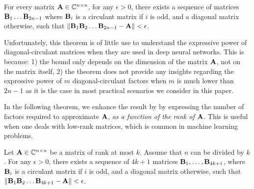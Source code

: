 \begin{theorem} \label{theorem:huhtanen}
  For every matrix $\mathbf{A} \in {\ensuremath \mathbb{C}}^{n \times n}$, for any $\epsilon > 0$, there exists a sequence of matrices $\mathbf{B}_1 \ldots \mathbf{B}_{2n-1}$ where $\mathbf{B}_{i}$ is a circulant matrix if $i$ is odd, and a diagonal matrix otherwise, such that $\norm{\mathbf{B}_{1} \mathbf{B}_{2} \ldots \mathbf{B}_{2n-1} - \mathbf{A}} < \epsilon$.
\end{theorem}

Unfortunately, this theorem is of little use to understand the expressive power of diagonal-circulant matrices when they are used in deep neural networks.
This is because: 1) the bound only depends on the dimension of the matrix $\mathbf{A}$, not on the matrix itself, 2) the theorem does not provide any insights regarding the expressive power of $m$ diagonal-circulant factors when $m$ is much lower than $2n - 1$ as it is the case in most practical scenarios we consider in this paper. 

In the following theorem, we enhance the result by \citet{Huhtanen2015} by expressing the number of factors required to approximate $\mathbf{A}$, \emph{as a function of the rank of $\mathbf{A}$}.
This is useful when one deals with low-rank matrices, which is common in machine learning problems. 

\begin{theorem} \label{theorem:rank-decomposition}
Let $\mathbf{A} \in {\ensuremath \mathbb{C}}^{n \times n}$ be a matrix of rank at most $k$.
Assume that $n$ can be divided by $k$.
For any $\epsilon > 0$, there exists a sequence of $4k+1$ matrices $\mathbf{B}_{1}, \ldots, \mathbf{B}_{4k+1}$, where $\mathbf{B}_{i}$ is a circulant matrix if $i$ is odd, and a diagonal matrix otherwise, such that $\norm{\mathbf{B}_1 \mathbf{B}_2 \ldots \mathbf{B}_{4k+1} - \mathbf{A}} < \epsilon$.
\end{theorem}

